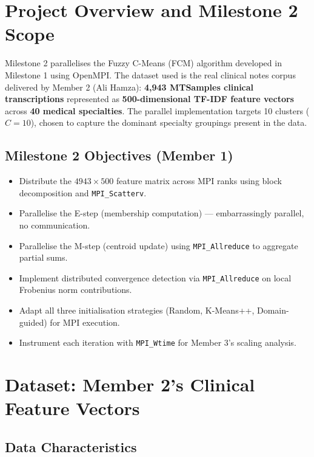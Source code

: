 \documentclass[12pt,a4paper]{article}
\begin{document}
\tableofcontents
\newpage

\section{Project Overview and Milestone 2 Scope}

Milestone 2 parallelises the Fuzzy C-Means (FCM) algorithm developed in Milestone 1 using OpenMPI. The dataset used is the real clinical notes corpus delivered by Member 2 (Ali Hamza): \textbf{4,943 MTSamples clinical transcriptions} represented as \textbf{500-dimensional TF-IDF feature vectors} across \textbf{40 medical specialties}. The parallel implementation targets 10 clusters ($C = 10$), chosen to capture the dominant specialty groupings present in the data.

\subsection{Milestone 2 Objectives (Member 1)}

\begin{itemize}[leftmargin=1.5em]
    \item Distribute the $4943 \times 500$ feature matrix across MPI ranks using block decomposition and \texttt{MPI\_Scatterv}.
    \item Parallelise the E-step (membership computation) — embarrassingly parallel, no communication.
    \item Parallelise the M-step (centroid update) using \texttt{MPI\_Allreduce} to aggregate partial sums.
    \item Implement distributed convergence detection via \texttt{MPI\_Allreduce} on local Frobenius norm contributions.
    \item Adapt all three initialisation strategies (Random, K-Means++, Domain-guided) for MPI execution.
    \item Instrument each iteration with \texttt{MPI\_Wtime} for Member 3's scaling analysis.
\end{itemize}

\section{Dataset: Member 2's Clinical Feature Vectors}

\subsection{Data Characteristics}
\end{document}
